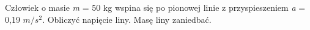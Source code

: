 Człowiek o masie \emph{m} = 50 kg wspina się po pionowej linie z przyspieszeniem \emph{a} = 0,19 $m/s^2$. Obliczyć napięcie liny. Masę liny zaniedbać.

